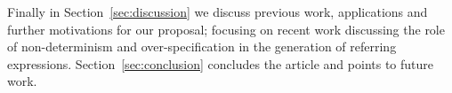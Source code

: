 Finally in Section~\ref{sec:discussion} we discuss previous work, applications and further motivations for our proposal; focusing on recent work discussing the role of non-determinism and over-specification in the generation of referring expressions. Section~\ref{sec:conclusion} concludes the article and points to future work.

